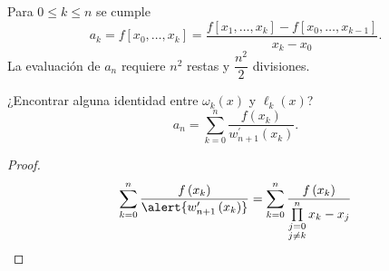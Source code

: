 \begin{frame}
	\begin{theorem}
		Para $0\leq k\leq n$ se cumple
		\begin{equation*}
			a_{k}=
			f\left[x_{0},\ldots,x_{k}\right]=
			\dfrac{
			f\left[x_{1},\ldots,x_{k}\right]-
			f\left[x_{0},\ldots,x_{k-1}\right]
			}{x_{k}-x_{0}}.
		\end{equation*}
		La evaluación de $a_{n}$ requiere $n^{2}$ restas y
		$\dfrac{n^{2}}{2}$ divisiones.
	\end{theorem}


	\begin{theorem}
		¿Encontrar alguna identidad entre $\omega_{k}\left(x\right)$ y
		$\ell_{k}\left(x\right)$?
		\begin{equation*}
			a_{n}=
			\sum\limits_{k=0}^{n}
			\dfrac{
				f\left(x_{k}\right)
			}{
				w^{\prime}_{n+1}
				\left(x_{k}\right)
			}.
		\end{equation*}
	\end{theorem}

	\begin{proof}
		\begin{equation*}
			\sum\limits_{k=0}^{n}
			\dfrac{
				f\left(x_{k}\right)
			}{
				\alert{
					w^{\prime}_{n+1}
					\left(x_{k}\right)
				}
			}=
			\sum\limits_{k=0}^{n}
			\dfrac{
			f\left(x_{k}\right)
			}{
			\prod\limits_{\substack{j=0 \\j\neq k}}^{n}
			x_{k}-x_{j}
			}
		\end{equation*}
	\end{proof}

\end{frame}